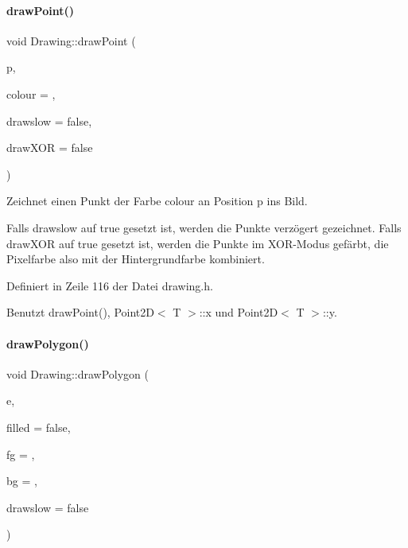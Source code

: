 \paragraph{\texorpdfstring{draw\+Point()}{drawPoint()}\hspace{0.1cm}{\footnotesize\ttfamily [2/2]}}
{\footnotesize\ttfamily void Drawing\+::draw\+Point (\begin{DoxyParamCaption}\item[{\mbox{\hyperlink{point2d_8h_aeeeb57e4186edb0a4274b64925e0d0fb}{I\+Point2D}}}]{p,  }\item[{\mbox{\hyperlink{classDrawColour}{Draw\+Colour}}}]{colour = {},  }\item[{bool}]{drawslow = {\ttfamily false},  }\item[{bool}]{draw\+X\+OR = {\ttfamily false} }\end{DoxyParamCaption})\hspace{0.3cm}{\ttfamily [inline]}}



Zeichnet einen Punkt der Farbe {\ttfamily colour} an Position {\ttfamily p} ins Bild. 

Falls {\ttfamily drawslow} auf {\ttfamily true} gesetzt ist, werden die Punkte verzögert gezeichnet. Falls {\ttfamily draw\+X\+OR} auf {\ttfamily true} gesetzt ist, werden die Punkte im X\+O\+R-\/\+Modus gefärbt, die Pixelfarbe also mit der Hintergrundfarbe kombiniert. 

Definiert in Zeile 116 der Datei drawing.\+h.



Benutzt draw\+Point(), Point2\+D$<$ T $>$\+::x und Point2\+D$<$ T $>$\+::y.

\mbox{\label{classDrawing_ad449deed6b1939b2232158ce25d327ee}} 
\paragraph{\texorpdfstring{draw\+Polygon()}{drawPolygon()}}
{\footnotesize\ttfamily void Drawing\+::draw\+Polygon (\begin{DoxyParamCaption}\item[{const std\+::vector$<$ \mbox{\hyperlink{point2d_8h_aeeeb57e4186edb0a4274b64925e0d0fb}{I\+Point2D}} $>$ \&}]{e,  }\item[{bool}]{filled = {\ttfamily false},  }\item[{\mbox{\hyperlink{classDrawColour}{Draw\+Colour}}}]{fg = {},  }\item[{\mbox{\hyperlink{classDrawColour}{Draw\+Colour}}}]{bg = {},  }\item[{bool}]{drawslow = {\ttfamily false} }\end{DoxyParamCaption})}



